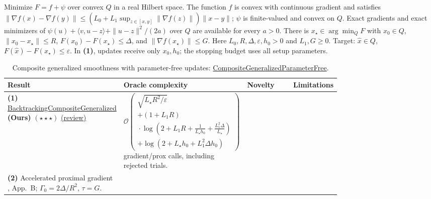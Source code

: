 \begin{table}[tp]
\centering
\caption{Composite generalized smoothness with parameter-free updates: \href{https://github.com/k3nfalt/longtails/blob/main/LongTails/Setups/CompositeGeneralizedParameterFree.lean}{CompositeGeneralizedParameterFree}.}\label{tab:CompositeGeneralizedParameterFree}
\parbox{\linewidth}{\footnotesize Minimize $F=f+\psi$ over convex $Q$ in a real Hilbert space. The function $f$ is convex with continuous gradient and satisfies $\|\nabla f(x)-\nabla f(y)\|\le (L_0+L_1\sup_{z\in[x,y]}\|\nabla f(z)\|)\|x-y\|$; $\psi$ is finite-valued and convex on $Q$. Exact gradients and exact minimizers of $\psi(u)+\langle v,u-z\rangle+\|u-z\|^2/(2a)$ over $Q$ are available for every $a>0$. There is $x_\star\in\arg\min_Q F$ with $x_0\in Q$, $\|x_0-x_\star\|\le R$, $F(x_0)-F(x_\star)\le\Delta$, and $\|\nabla f(x_\star)\|\le G$. Here $L_0,R,\Delta,\varepsilon,h_0>0$ and $L_1,G\ge0$. Target: $\widehat x\in Q$, $F(\widehat x)-F(x_\star)\le\varepsilon$. In \textbf{(1)}, updates receive only $x_0,h_0$; the stopping budget uses all setup parameters.}\par\smallskip
\begin{threeparttable}
\footnotesize
\setlength{\tabcolsep}{4pt}\renewcommand{\arraystretch}{1.25}
\begin{tabularx}{\linewidth}{@{}>{\raggedright\arraybackslash}p{0.20\linewidth}>{\raggedright\arraybackslash}p{0.32\linewidth}>{\raggedright\arraybackslash}p{0.25\linewidth}>{\raggedright\arraybackslash}X@{}}
\toprule
\textbf{Result} & \textbf{Oracle complexity} & \textbf{Novelty} & \textbf{Limitations} \\
\midrule
\textbf{(1)} \href{https://github.com/k3nfalt/longtails/blob/main/LongTails/Theorems/BacktrackingCompositeGeneralized.lean}{Backtracking\allowbreak{}Composite\allowbreak{}Generalized} \textbf{(Ours)} $(\star\star\star)$ \href{https://github.com/k3nfalt/longtails/blob/main/scripts/reviews/BacktrackingCompositeGeneralized.md}{(review)}
& $\mathcal{O}\!\left(\begin{gathered} \sqrt{L_\star R^2/\varepsilon}\\ +(1+L_1R)\\ {}\cdot\log\!\left(2+L_1R+\frac1{L_\star h_0}+\frac{L_1^2\Delta}{L_\star}\right)\\ +\log(2+L_\star h_0+L_1^2\Delta h_0)\end{gathered}\right)$ gradient/prox calls, including rejected trials.
& & \\
\midrule[1.2pt]
\textbf{(2)} Accelerated proximal gradient \citep{LiEtAl2026CompositeV3}, App.~B; $\Gamma_0=2\Delta/R^2$, $\tau=G$.

\end{tabularx}
\end{threeparttable}
\end{table}

